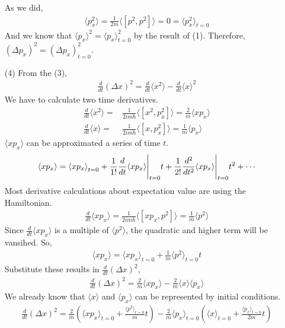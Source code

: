 \documentclass[aps,floatfix,nofootinbib,superscriptaddress,fleqn]{revtex4}
\begin{document}
\begin{itemize}
As we did, 
\begin{align}
  \langle p_x^2\rangle = \frac{1}{2m}\langle \left[p^2,p^2\right] \rangle = 0 = \langle p_x^2\rangle_{t=0}
\end{align}
And we know that $\langle p_x\rangle^2 = \langle p_x\rangle^2_{t=0}$ by the result of (1).
Therefore, ${(\Delta p_x)}^2  = {(\Delta p_x)}^2_{t=0}$.
\item[(4)] From the (3),
  \begin{align}
          \frac{d}{dt}{(\Delta x)}^2 = \frac{d}{dt}\langle x^2\rangle - \frac{d}{dt}\langle x\rangle^2
  \end{align}
  We have to calculate two time derivatives.
  \begin{align}
    \frac{d}{dt}\langle x^2\rangle=&\frac{1}{2im\hbar}\langle\left[x^2,p^2_x\right]\rangle=\frac{2}{m}\langle xp_x \rangle \\
    \frac{d}{dt}\langle x\rangle=&\frac{1}{2im\hbar}\langle\left[x,p^2_x\right]\rangle=\frac{1}{m}\langle p_x\rangle
  \end{align}
  $\langle xp_x \rangle$ can be approximated a series of time $t$.
  \begin{align}
    \langle xp_x \rangle = {\langle xp_x \rangle}_{t=0} + \frac{1}{1!}\frac{d}{dt}\langle xp_x \rangle \Bigg{|}_{t=0}t 
    + \frac{1}{2!}\frac{d^2}{dt^2}\langle xp_x \rangle \Bigg{|}_{t=0}t^2+\cdots
  \end{align}
  Most derivative calculations about expectation value are using the Hamiltonian.
  \begin{align}
    \frac{d}{dt}\langle xp_x \rangle = \frac{1}{2im\hbar}\langle \left[ xp_x,p^2 \right] \rangle= \frac{1}{m}\langle p^2 \rangle
  \end{align} 
  Since $\frac{d}{dt}\langle xp_x \rangle$ is a multiple of $\langle p^2 \rangle$, the quadratic and higher term will be vansihed. So,
  \begin{align}
    \langle xp_x \rangle=\langle xp_x \rangle_{t=0}+\frac{1}{m}\langle p^2 \rangle_{t=0}t
  \end{align}
    Substitute these results in $\frac{d}{dt}{(\Delta x)}^2$,
\begin{align}
  \frac{d}{dt}{(\Delta x)}^2=\frac{2}{m}\langle xp_x \rangle- \frac{2}{m}\langle x\rangle\langle p_x\rangle
\end{align}
We already know that $\langle x \rangle$ and $\langle p_x \rangle$ can be represented by initial conditions.
 \begin{align}
  \frac{d}{dt}{(\Delta x)}^2 = \frac{2}{m}\left(\langle xp_x \rangle_{t=0}+\frac{\langle p^2 \rangle_{t=0}}{m}t\right) 
  - \frac{2}{m}\langle p_x\rangle_{t=0}\left(\langle x\rangle_{t=0}+\frac{\langle p_x \rangle_{t=0}}{2m}t\right)
 \end{align}
\end{itemize}
\end{document}
